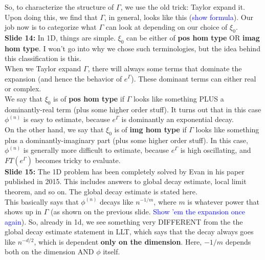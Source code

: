 \documentclass[11pt]{article}
\begin{document}
So, to characterize the structure of $\Gamma$, we use the old trick: Taylor expand it. Upon doing this, we find that $\Gamma$, in general, looks like this (\textcolor{blue}{show formula}). Our job now is to categorize what $\Gamma$ can look at depending on our choice of $\xi_0$. \\




\noindent \textbf{Slide 14:} In 1D, things are simple. $\xi_0$ can be either of \textbf{pos hom type} OR \textbf{imag hom type}. I won't go into why we chose such terminologies, but the idea behind this classification is this. \\


When we Taylor expand $\Gamma$, there will always some terms that dominate the expansion (and hence the behavior of $e^\Gamma$). These dominant terms can either real or complex. \\


We say that $\xi_0$ is of \textbf{pos hom type} if $\Gamma$ looks like something PLUS a dominantly-real term (plus some higher order stuff). It turns out that in this case $\phi^{(n)}$ is easy to estimate, because $e^\Gamma$ is dominantly an exponential decay. \\


On the other hand, we say that $\xi_0$ is of \textbf{img hom type} if $\Gamma$ looks like something plus a dominantly-imaginary part (plus some higher order stuff). In this case, $\phi^{(n)}$ is generally more difficult to estimate, because $e^\Gamma$ is high oscillating, and $FT(e^\Gamma)$ becomes tricky to evaluate. \\




\noindent \textbf{Slide 15: } The 1D problem has been completely solved by Evan in his paper published in 2015. This includes answers to global decay estimate, local limit theorem, and so on. The global decay estimate is stated here. \\

This basically says that $\phi^{(n)}$ decays like $n^{-1/m}$, where $m$ is whatever power that shows up in $\Gamma$ (as shown on the previous slide. \textcolor{blue}{Show 'em the expansion once again}). So, already in 1d, we see something very DIFFERENT from the the global decay estimate statement in LLT, which says that the decay always goes like $n^{-d/2}$, which is dependent \textbf{only on the dimension}. Here, $-1/m$ depends both on the dimension AND $\phi$ itself. \\
\end{document}
